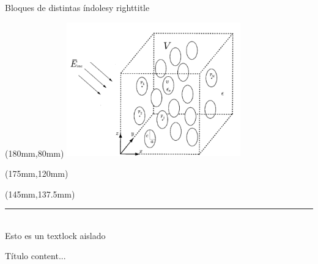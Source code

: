 {\begin{frame}{Bloques de distintas índoles\footnotemark[1]y righttitle}
    \begin{textblock*}{75mm}(180mm,80mm)
    \includegraphics[width=75mm]{img/1-multiple.png}
\end{textblock*}
\begin{textblock*}{22mm}(175mm,120mm)
    \begin{flushright}
    \scriptsize
    \end{flushright}
\end{textblock*}


    \begin{textblock*}{80mm}(145mm,137.5mm)
        \begin{flushleft}
        \scriptsize
        \rule{30mm}{.5pt}\\
        \footnotemark[1]
        Esto es un textlock aislado
    \end{flushleft}
     \end{textblock*}
\end{frame}
}

\begin{frame}{Título}{}
	content...
\end{frame}

